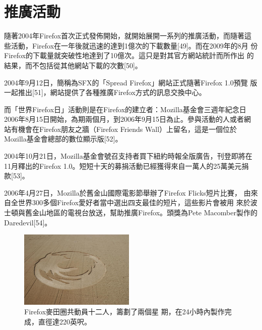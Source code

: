 \documentclass[12pt, a4paper, twoside]{article}
\begin{document}
\section{推廣活動}

隨著2004年Firefox首次正式發佈開始，就開始展開一系列的推廣活動，而隨著這
些活動，Firefox在一年後就迅速的達到1億次的下載數量[49]。而在2009年的8月
份Firefox的下載量就突破性地達到了10億次。這只是對其官方網站統計而所作出
的結果，而不包括從其他網站下載的次數[50]。

2004年9月12日，簡稱為SFX的「Spread Firefox」網站正式隨著Firefox 1.0預覽
版一起推出[51]，網站提供了各種推廣Firefox方式的訊息交換中心。

而「世界Firefox日」活動則是在Firefox的建立者：Mozilla基金會三週年紀念日
2006年8月15日開始，為期兩個月，到2006年9月15日為止。參與活動的人或者網
站有機會在Firefox朋友之牆（Firefox Friends Wall）上留名，這是一個位於
Mozilla基金會總部的數位顯示版[52]。

2004年10月21日，Mozilla基金會號召支持者買下紐約時報全版廣告，刊登即將在
11月釋出的Firefox 1.0。短短十天的募捐活動已經獲得來自一萬人的25萬美元捐
款[53]。

2006年4月27日，Mozilla於舊金山國際電影節舉辦了Firefox Flicks短片比賽，
由來自全世界300多個Firefox愛好者當中選出四支最佳的短片，這些影片會被用
來於波士頓與舊金山地區的電視台放送，幫助推廣Firefox。頭獎為Pete
Macomber製作的Daredevil[54]。

\addtocounter{footnote}{-3}
\begin{figure}
  \begin{center}
    \includegraphics[width=55mm]{Firefox_Crop_Circle}
  \end{center}
  \caption{Firefox麥田圈共動員十二人\protect\footnotemark，籌劃了兩個星
    期，在24小時內製作完成\protect\footnotemark，直徑達220英呎。
    \protect\footnotemark}
\end{figure}

\addtocounter{footnote}{-3}
\end{document}
